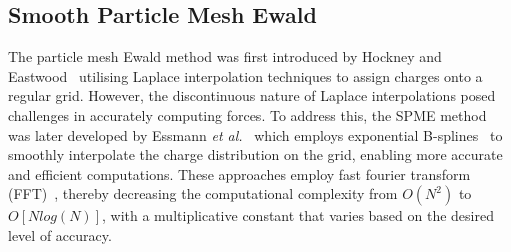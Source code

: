 \subsection{Smooth Particle Mesh Ewald}
The particle mesh Ewald method was first introduced by Hockney and Eastwood~\cite{hockney2021computer} utilising Laplace interpolation techniques to assign charges onto a regular grid. However, the discontinuous nature of Laplace interpolations posed challenges in accurately computing forces. To address this, the \ac{SPME} method was later developed by Essmann \textit{et al.}~\cite{SPME} which employs exponential B-splines~\cite{prautzsch2002bezier} to smoothly interpolate the charge distribution on the grid, enabling more accurate and efficient computations. These approaches employ fast fourier transform (FFT)~\cite{FFTW05}, thereby decreasing the computational complexity from $O(N^2)$ to $O[Nlog(N)]$, with a multiplicative constant that varies based on the desired level of accuracy.

